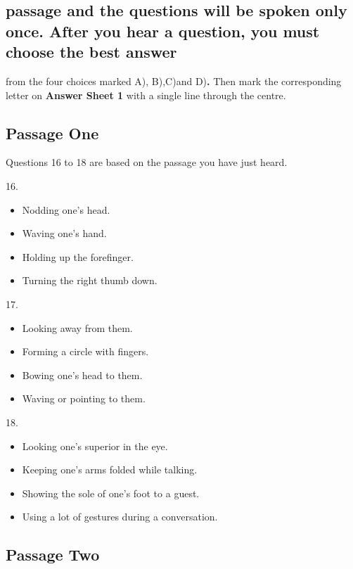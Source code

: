 \documentclass[UTF8,11pt]{ctexart}
\begin{document}
\subsection*{passage and the questions will be spoken only once. After you hear a question, you must choose the best answer}


from the four choices marked A), B),C)and D)\textbf{.} Then mark the corresponding letter on\textbf{ Answer Sheet 1} with a single line through the centre.


\subsection*{Passage One}


Questions 16 to 18 are based on the passage you have just heard.


16.


\begin{itemize}[leftmargin=2em,itemsep=.2em,topsep=.4em]\item[A.] Nodding one’s head.
\item[B.] Waving one’s hand.
\item[C.] Holding up the forefinger.
\item[D.] Turning the right thumb down.
\end{itemize}

17.


\begin{itemize}[leftmargin=2em,itemsep=.2em,topsep=.4em]\item[A.] Looking away from them.
\item[B.] Forming a circle with fingers.
\item[C.] Bowing one’s head to them.
\item[D.] Waving or pointing to them.
\end{itemize}

18.


\begin{itemize}[leftmargin=2em,itemsep=.2em,topsep=.4em]\item[A.] Looking one’s superior in the eye.
\item[B.] Keeping one’s arms folded while talking.
\item[C.] Showing the sole of one’s foot to a guest.
\item[D.] Using a lot of gestures during a conversation.
\end{itemize}

\subsection*{Passage Two}
\end{document}
